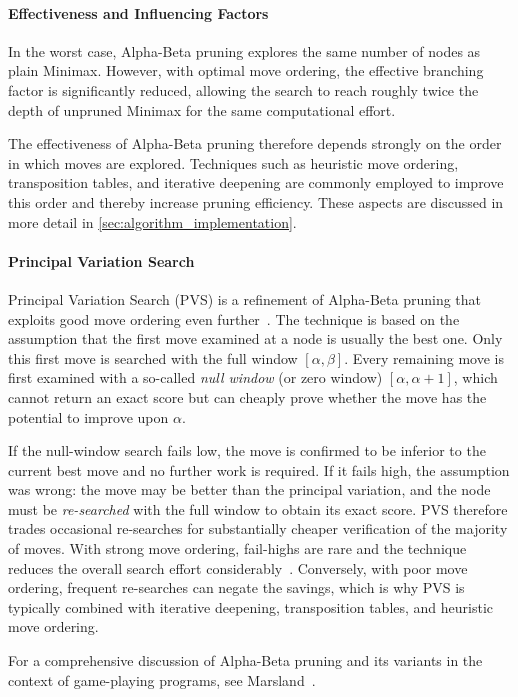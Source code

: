 \paragraph{Effectiveness and Influencing Factors}
In the worst case, Alpha-Beta pruning explores the same number of nodes as plain
Minimax. However, with optimal move ordering, the effective branching factor is
significantly reduced, allowing the search to reach roughly twice the depth of
unpruned Minimax for the same computational effort.

The effectiveness of Alpha-Beta pruning therefore depends strongly on the order
in which moves are explored. Techniques such as heuristic move ordering,
transposition tables, and iterative deepening are commonly employed to improve
this order and thereby increase pruning efficiency. These aspects are discussed
in more detail in \cref{sec:algorithm_implementation}.

\paragraph{Principal Variation Search}
Principal Variation Search (PVS) is a refinement of Alpha-Beta pruning that
exploits good move ordering even further~\cite{marsland1982parallel,
pearl1980scout}. The technique is based on the assumption that the first move
examined at a node is usually the best one. Only this first move is searched
with the full window $[\alpha, \beta]$. Every remaining move is first examined
with a so-called \emph{null window} (or zero window) $[\alpha, \alpha + 1]$,
which cannot return an exact score but can cheaply prove whether the move has
the potential to improve upon $\alpha$.

If the null-window search fails low, the move is confirmed to be inferior to
the current best move and no further work is required. If it fails high, the
assumption was wrong: the move may be better than the principal variation, and
the node must be \emph{re-searched} with the full window to obtain its exact
score. PVS therefore trades occasional re-searches for substantially cheaper
verification of the majority of moves. With strong move ordering, fail-highs
are rare and the technique reduces the overall search effort
considerably~\cite{reinefeld1983negascout}. Conversely, with poor move
ordering, frequent re-searches can negate the savings, which is why PVS is
typically combined with iterative deepening, transposition tables, and
heuristic move ordering.

For a comprehensive discussion of Alpha-Beta pruning and its variants in the
context of game-playing programs, see Marsland~\cite{marsland1986review}.

